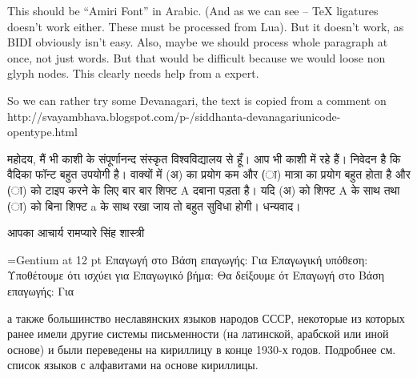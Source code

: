 \documentclass{article}
\begin{document}
\ahoj
{}

This should be ``Amiri Font'' in Arabic. (And as we can see -- TeX ligatures
doesn't work either. These must be processed from Lua). But it doesn't work, as
BIDI obviously isn't easy. Also, maybe we should process whole paragraph at
once, not just words. But that would be difficult because we would loose non
glyph nodes. This clearly needs help from a expert.

\siddhanta
So we can rather try some Devanagari, the text is copied from a comment on http://svayambhava.\-blogspot.com\-/p\--/\-sidd\-hanta-\-deva\-na\-ga\-ri\-unicode-\-open\-type.html


महोदय,
मैं भी काशी के संपूर्णानन्द संस्कृत विश्वविद्यालय से हूँ। आप भी काशी में रहे हैं।
निवेदन है कि वैदिका फॉन्ट बहुत उपयोगी है। वाक्यों में (अ) का प्रयोग कम और (ा) मात्रा का प्रयोग बहुत होता है और (ा) को टाइप करने के लिए बार बार शिफ्ट A दबाना पड़ता है। यदि (अ) को शिफ्ट A के साथ तथा (ा) को बिना शिफ्ट a के साथ रखा जाय तो बहुत सुविधा होगी।
धन्यवाद।

आपका
आचार्य रामप्यारे सिंह शास्त्री

\font\gentium={Gentium} at 12 pt
\gentium
Επαγωγή στο 
Βάση επαγωγής: Για 
Επαγωγική υπόθεση: Υποθέτουμε ότι ισχύει για 
Επαγωγικό βήμα: Θα δείξουμε ότ
Επαγωγή στο
Βάση επαγωγής: Για 

\gentium

а также большинство неславянских языков народов СССР, некоторые из которых
ранее имели другие системы письменности (на латинской, арабской или иной
основе) и были переведены на кириллицу в конце 1930-х годов. Подробнее см.
список языков с алфавитами на основе кириллицы.  
\end{document}

